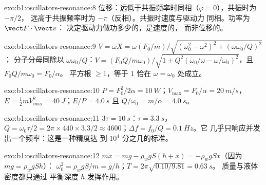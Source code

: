 \begin{solution}{exo:b1:oscillators-resonance:8}
位移：远低于共振频率时同相（$\varphi = 0$），共振时为 $-\pi/2$，
远高于共振频率时为 $-\pi$（反相）。共振时速度与驱动力
同相。功率为 $\vect F\cdot\vect v$：
决定驱动力做功多少的，是速度的，
而非位移的。
\end{solution}

\begin{solution}{exo:b1:oscillators-resonance:9}
$V = \omega X = \omega(F_0/m)/\allowbreak\sqrt{(\omega_0^2 - \omega^2)^2 + (\omega\omega_0/Q)^2}$；
分子分母同除以 $\omega\omega_0/Q$：$V = (F_0Q/m\omega_0)/\allowbreak
\sqrt{1 + Q^2(\omega_0/\omega - \omega/\omega_0)^2}$，且 $F_0Q/m\omega_0 = F_0/\alpha$。
平方根 $\geq 1$，等于 $1$ 恰在 $\omega = \omega_0$ 处成立。
\end{solution}

\begin{solution}{exo:b1:oscillators-resonance:10}
$P = F_0^2/2\alpha = \qty{10}{W}$；$V_{\max} = F_0/\alpha = \qty{20}{m/s}$，
$E = \tfrac12 mV_{\max}^2 = \qty{40}{J}$；$E/P = \qty{4.0}{s}$ 且 $Q/\omega_0 =
m/\alpha = \qty{4.0}{s}$。
\end{solution}

\begin{solution}{exo:b1:oscillators-resonance:11}
$3\tau = \qty{10}{s}$：$\tau = \qty{3.3}{s}$，$Q = \omega_0\tau/2 = 2\pi \times
440 \times 3.3/2 \approx 4600$；$\Delta f = f_0/Q = \qty{0.1}{Hz}$。它
几乎只响应并发出一个频率：这是一种精度达
到 $10^4$ 分之几的标准。
\end{solution}

\begin{solution}{exo:b1:oscillators-resonance:12}
$m\ddot x = mg - \rho_wgS(h + x) = -\rho_wgSx$（因为 $mg = \rho_wgSh$）：
$\omega_0^2 = \rho_wgS/m = g/h$；$T = 2\pi\sqrt{0.10/9.81} = \qty{0.63}{s}$。
质量与液体密度都只通过
平衡深度 $h$ 发挥作用。
\end{solution}


